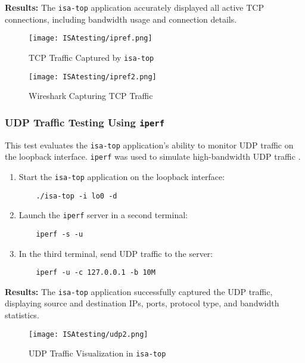 \documentclass[12pt]{extarticle}
\begin{document}
\textbf{Results:} The \texttt{isa-top} application accurately displayed all active TCP connections, including bandwidth usage and connection details. 

\begin{figure}[H]
    \centering
    \texttt{[image: ISAtesting/ipref.png]}
    \caption{TCP Traffic Captured by \texttt{isa-top}}
\end{figure}

\begin{figure}[H]
    \centering
    \texttt{[image: ISAtesting/ipref2.png]}
    \caption{Wireshark Capturing TCP Traffic}
\end{figure}

\subsubsection{UDP Traffic Testing Using \texttt{iperf}}

This test evaluates the \texttt{isa-top} application’s ability to monitor UDP traffic on the loopback interface. \texttt{iperf} was used to simulate high-bandwidth UDP traffic \cite{iperf}.

\begin{enumerate}
    \item Start the \texttt{isa-top} application on the loopback interface:
    \begin{verbatim}
    ./isa-top -i lo0 -d
    \end{verbatim}
    \item Launch the \texttt{iperf} server in a second terminal:
    \begin{verbatim}
    iperf -s -u
    \end{verbatim}
    \item In the third terminal, send UDP traffic to the server:
    \begin{verbatim}
    iperf -u -c 127.0.0.1 -b 10M
    \end{verbatim}
\end{enumerate}

\textbf{Results:} The \texttt{isa-top} application successfully captured the UDP traffic, displaying source and destination IPs, ports, protocol type, and bandwidth statistics.

\begin{figure}[H]
    \centering
    \texttt{[image: ISAtesting/udp2.png]}
    \caption{UDP Traffic Visualization in \texttt{isa-top}}
\end{figure}
\end{document}
